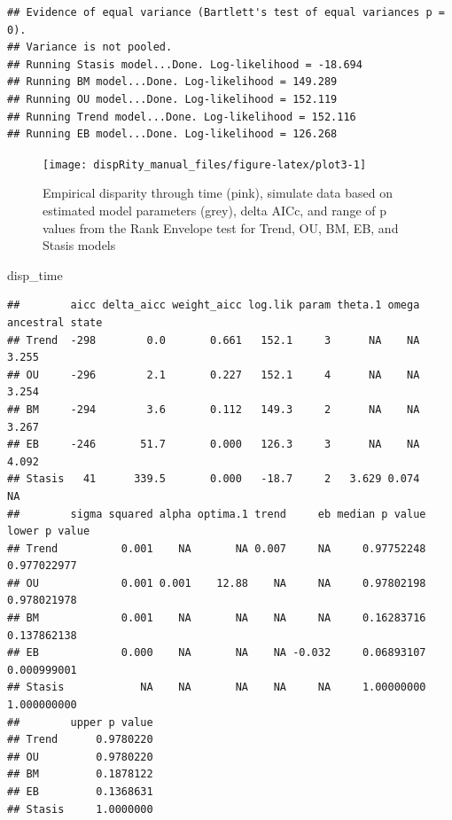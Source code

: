 \documentclass[]{book}
\newenvironment{Shaded}{\begin{snugshade}}{\end{snugshade}}
\newcommand{\NormalTok}[1]{#1}
\begin{document}
\begin{verbatim}
## Evidence of equal variance (Bartlett's test of equal variances p = 0).
## Variance is not pooled.
## Running Stasis model...Done. Log-likelihood = -18.694
## Running BM model...Done. Log-likelihood = 149.289
## Running OU model...Done. Log-likelihood = 152.119
## Running Trend model...Done. Log-likelihood = 152.116
## Running EB model...Done. Log-likelihood = 126.268
\end{verbatim}

\begin{figure}

{\centering \texttt{[image: dispRity\_manual\_files/figure-latex/plot3-1]} 

}

\caption{Empirical disparity through time (pink), simulate data based on estimated model parameters (grey), delta AICc, and range of p values from the Rank Envelope test for Trend, OU, BM, EB, and Stasis models}\label{fig:plot3}
\end{figure}

\begin{Shaded}
\begin{Highlighting}[]
\NormalTok{disp_time}
\end{Highlighting}
\end{Shaded}

\begin{verbatim}
##        aicc delta_aicc weight_aicc log.lik param theta.1 omega ancestral state
## Trend  -298        0.0       0.661   152.1     3      NA    NA           3.255
## OU     -296        2.1       0.227   152.1     4      NA    NA           3.254
## BM     -294        3.6       0.112   149.3     2      NA    NA           3.267
## EB     -246       51.7       0.000   126.3     3      NA    NA           4.092
## Stasis   41      339.5       0.000   -18.7     2   3.629 0.074              NA
##        sigma squared alpha optima.1 trend     eb median p value lower p value
## Trend          0.001    NA       NA 0.007     NA     0.97752248   0.977022977
## OU             0.001 0.001    12.88    NA     NA     0.97802198   0.978021978
## BM             0.001    NA       NA    NA     NA     0.16283716   0.137862138
## EB             0.000    NA       NA    NA -0.032     0.06893107   0.000999001
## Stasis            NA    NA       NA    NA     NA     1.00000000   1.000000000
##        upper p value
## Trend      0.9780220
## OU         0.9780220
## BM         0.1878122
## EB         0.1368631
## Stasis     1.0000000
\end{verbatim}
\end{document}
